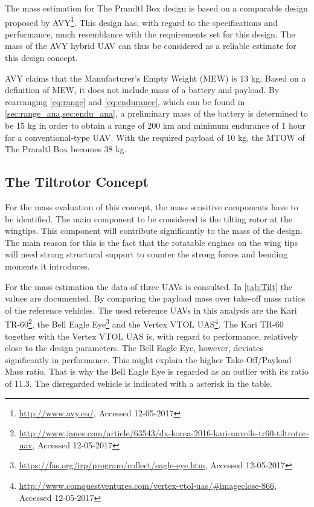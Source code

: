The mass estimation for The Prandtl Box design is based on a comparable design proposed by AVY\footnote{\url{http://www.avy.eu/}, Accessed 12-05-2017}. This design has, with regard to the specifications and performance, much resemblance with the requirements set for this design. The mass of the AVY hybrid UAV can thus be considered as a reliable estimate for this design concept.

AVY claims that the Manufacturer's Empty Weight (MEW) is 13 kg. Based on a definition of MEW, it does not include mass of a battery and payload. By rearranging \autoref{eq:range} and \autoref{eq:endurance}, which can be found in \cref{sec:range_ana,sec:endu_ana}, a preliminary mass of the battery is determined to be 15 kg in order to obtain a range of 200 km and minimum endurance of 1 hour for a conventional-type UAV. With the required payload of 10 kg, the MTOW of The Prandtl Box becomes 38 kg. 

\subsection{The Tiltrotor Concept}
For the mass evaluation of this concept, the mass sensitive components have to be identified. The main component to be considered is the tilting rotor at the wingtips. This component will contribute significantly to the mass of the design. The main reason for this is the fact that the rotatable engines on the wing tips will need strong structural support to counter the strong forces and bending moments it introduces.


For the mass estimation the data of three UAVs is consulted. In \autoref{tab:Tilt} the values are documented. By comparing the payload mass over take-off mass ratios of the reference vehicles. The used reference UAVs in this analysis are the Kari TR-60\footnote{\url{http://www.janes.com/article/63543/dx-korea-2016-kari-unveils-tr60-tiltrotor-uav}, Accessed 12-05-2017}, the Bell Eagle Eye\footnote{\url{https://fas.org/irp/program/collect/eagle-eye.htm}, Accessed 12-05-2017} and the Vertex VTOL UAS\footnote{\url{http://www.comquestventures.com/vertex-vtol-uas/\#imageclose-866},  Accessed 12-05-2017}. The Kari TR-60 together with the Vertex VTOL UAS is, with regard to performance, relatively close to the design parameters. The Bell Eagle Eye, however, deviates significantly in performance. This might explain the higher Take-Off/Payload Mass ratio. That is why the Bell Eagle Eye is regarded as an outlier with its ratio of 11.3. The disregarded vehicle is indicated with a asterisk in the table.  


